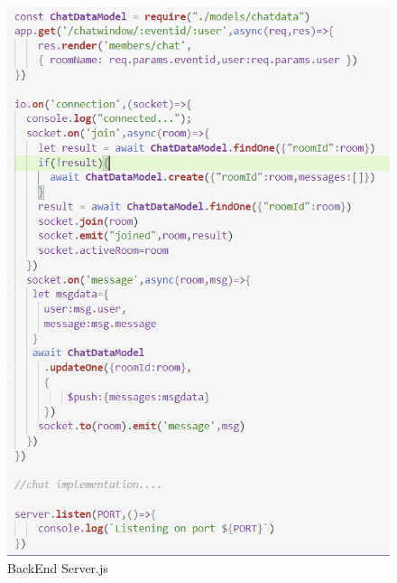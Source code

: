 \begin{figure}[H]
	\includegraphics[scale=0.5]{server2.png}
	\caption{BackEnd Server.js }
	\label{BackEnd Server.js}
\end{figure}

